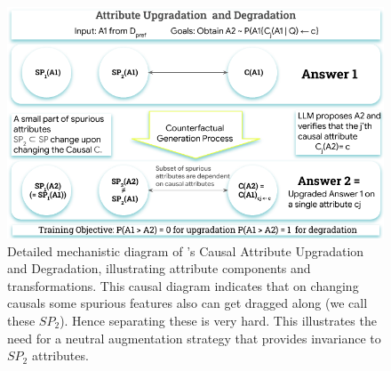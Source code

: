 \begin{figure}[!t]
    \centering
    \includegraphics[width=0.9\linewidth]{images/CausalAugmentationGraph.pdf}
    \caption{Detailed mechanistic diagram of \carma's Causal Attribute Upgradation and Degradation, illustrating attribute components and transformations. This causal diagram indicates that on changing causals some spurious features also can get dragged along (we call these $SP_2$). Hence separating these is very hard. This illustrates the need for a neutral augmentation strategy that provides invariance to $SP_2$ attributes.}
    \label{fig:detailed_augmentation_node_graph_appendix}
\end{figure}

